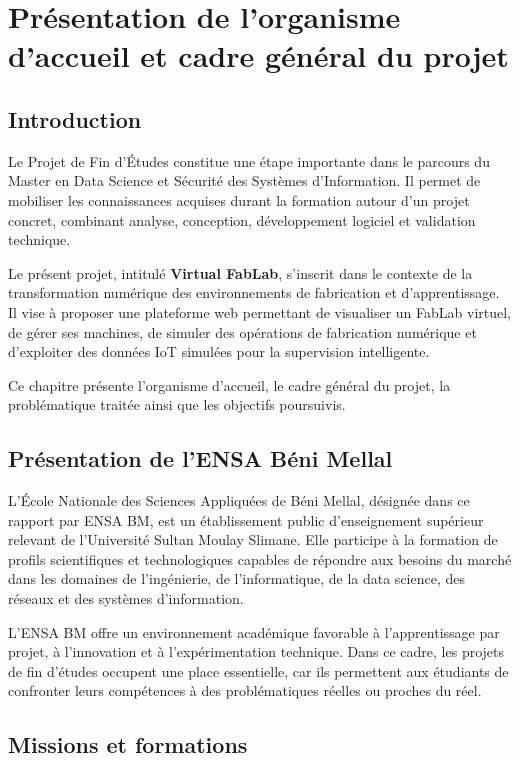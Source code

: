 \chapter[Présentation de l’organisme]{Présentation de l’organisme d’accueil et cadre général du projet}

\section{Introduction}

Le Projet de Fin d’Études constitue une étape importante dans le parcours du Master en Data Science et Sécurité des Systèmes d’Information. Il permet de mobiliser les connaissances acquises durant la formation autour d’un projet concret, combinant analyse, conception, développement logiciel et validation technique.

Le présent projet, intitulé \textbf{Virtual FabLab}, s’inscrit dans le contexte de la transformation numérique des environnements de fabrication et d’apprentissage. Il vise à proposer une plateforme web permettant de visualiser un FabLab virtuel, de gérer ses machines, de simuler des opérations de fabrication numérique et d’exploiter des données IoT simulées pour la supervision intelligente.

Ce chapitre présente l’organisme d’accueil, le cadre général du projet, la problématique traitée ainsi que les objectifs poursuivis.

\section{Présentation de l’ENSA Béni Mellal}

L’École Nationale des Sciences Appliquées de Béni Mellal, désignée dans ce rapport par ENSA BM, est un établissement public d’enseignement supérieur relevant de l’Université Sultan Moulay Slimane. Elle participe à la formation de profils scientifiques et technologiques capables de répondre aux besoins du marché dans les domaines de l’ingénierie, de l’informatique, de la data science, des réseaux et des systèmes d’information.

L’ENSA BM offre un environnement académique favorable à l’apprentissage par projet, à l’innovation et à l’expérimentation technique. Dans ce cadre, les projets de fin d’études occupent une place essentielle, car ils permettent aux étudiants de confronter leurs compétences à des problématiques réelles ou proches du réel.

\section{Missions et formations}

